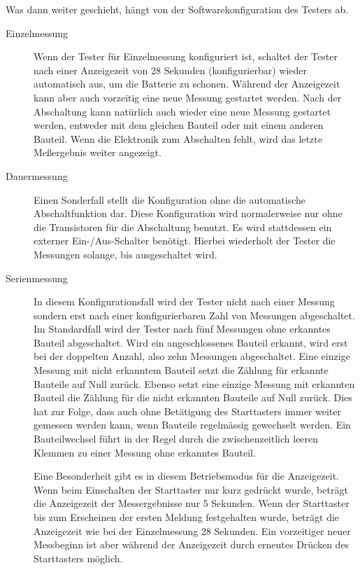 Was dann weiter geschieht, hängt von der Softwarekonfiguration des Testers ab.
\begin{description}
  \item[Einzelmessung] Wenn der Tester für Einzelmessung konfiguriert ist, schaltet der Tester nach einer Anzeigezeit
von 28 Sekunden (konfigurierbar) wieder automatisch aus, um die Batterie zu schonen.
Während der Anzeigezeit kann aber auch vorzeitig eine neue Messung gestartet werden.
Nach der Abschaltung kann natürlich auch wieder eine
neue Messung gestartet werden, entweder mit dem gleichen Bauteil oder mit einem anderen Bauteil.
Wenn die Elektronik zum Abschalten fehlt, wird das letzte Meßergebnis weiter angezeigt.

  \item[Dauermessung] Einen Sonderfall stellt die Konfiguration ohne die automatische Abschaltfunktion dar.
Diese Konfiguration wird normalerweise nur ohne die Transistoren für die Abschaltung benutzt.
Es wird stattdessen ein externer Ein-/Aus-Schalter benötigt. Hierbei wiederholt der Tester die
Messungen solange, bis ausgeschaltet wird.

  \item[Serienmessung] In diesem Konfigurationsfall wird der Tester nicht nach einer Messung sondern erst nach einer konfigurierbaren
Zahl von Messungen abgeschaltet. Im Standardfall wird der Tester nach fünf Messungen ohne erkanntes Bauteil
abgeschaltet. Wird ein angeschlossenes Bauteil erkannt, wird erst bei der doppelten Anzahl, also zehn Messungen abgeschaltet.
Eine einzige Messung mit nicht erkanntem Bauteil setzt die Zählung für erkannte Bauteile auf Null zurück.
Ebenso setzt eine einzige Messung mit erkannten Bauteil die Zählung für die nicht erkannten Bauteile auf Null zurück.
Dies hat zur Folge, dass auch ohne Betätigung des Starttasters immer weiter gemessen werden kann,
 wenn Bauteile regelmässig gewechselt werden.
Ein Bauteilwechsel führt in der Regel durch die zwischenzeitlich leeren Klemmen zu einer Messung ohne erkanntes Bauteil.

Eine Besonderheit gibt es in diesem Betriebsmodus für die Anzeigezeit. Wenn beim Einschalten der Starttaster nur kurz
gedrückt wurde, beträgt die Anzeigezeit der Messergebnisse nur 5 Sekunden. Wenn der Starttaster bis zum Erscheinen der
ersten Meldung festgehalten wurde, beträgt die Anzeigezeit wie bei der Einzelmessung 28 Sekunden.
Ein vorzeitiger neuer Messbeginn ist aber während der Anzeigezeit durch erneutes Drücken des Starttasters möglich.

\end{description}

